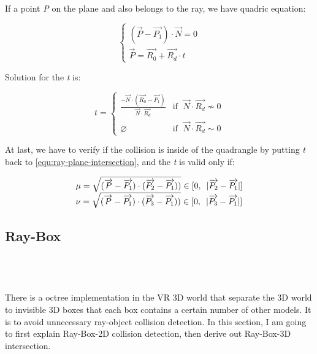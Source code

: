 If a point \emph{P} on the plane and also belongs to the ray, we have quadric equation:

\begin{equation}
\label{equ:ray-plane-intersection}
\left\{
\begin{array}{lr}
(\overrightarrow{P} - \overrightarrow{P_1}) \cdot \overrightarrow{N} = 0 \\
\overrightarrow{P} = \overrightarrow{R_0} + \overrightarrow{R_d} \cdot t
\end{array}
\right.
\end{equation}

Solution for the \emph{t} is:

\[
t =
\begin{cases}
\frac{-\overrightarrow{N} \cdot (\overrightarrow{R_0} - \overrightarrow{P_1})}{\overrightarrow{N} \cdot \overrightarrow{R_d}} & \text{if }\;\overrightarrow{N} \cdot \overrightarrow{R_d} \nsim 0 \\
\varnothing & \text{if }\;\overrightarrow{N} \cdot \overrightarrow{R_d} \sim 0
\end{cases}
\]

At last, we have to verify if the collision is inside of the quadrangle by putting \emph{t} back to \ref{equ:ray-plane-intersection}, and the \emph{t} is valid only if:

\[
\begin{array}{lr}
\mu = \sqrt{(\overrightarrow{P} - \overrightarrow{P_1}) \cdot (\overrightarrow{P_2} - \overrightarrow{P_1}))} \in [0,\enspace\lvert \overrightarrow{P_2} - \overrightarrow{P_1} \rvert] \\
\nu = \sqrt{(\overrightarrow{P} - \overrightarrow{P_1}) \cdot (\overrightarrow{P_3} - \overrightarrow{P_1}))} \in [0,\enspace\lvert \overrightarrow{P_3} - \overrightarrow{P_1} \rvert] 
\end{array}
\]

\subsection{Ray-Box}
\parencite{Williams.ray-box.2005} \\
\parencite{Tavian.ray-box-2d.2011} \\
\parencite{scratchapixel.ray-plane-3d} \\

There is a octree implementation in the VR 3D world that separate the 3D world to invisible 3D boxes that each box contains a certain number of other models. It is to avoid unnecessary ray-object collision detection. In this section, I am going to first explain Ray-Box-2D collision detection, then derive out Ray-Box-3D intersection.

